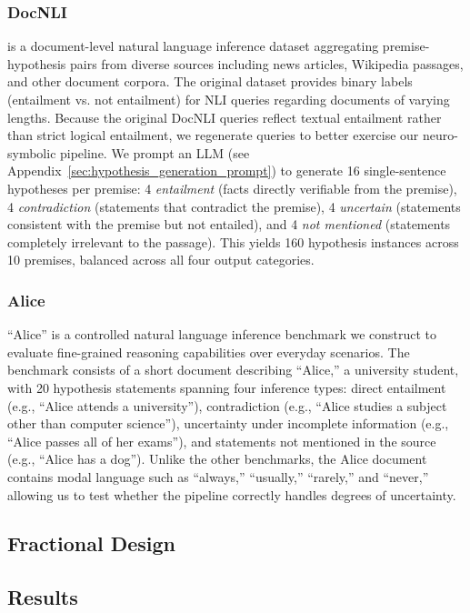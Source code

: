 \documentclass{article} %
\begin{document}
\subsubsection{DocNLI} 
\citep{yin2021docnli} is a document-level natural language inference dataset aggregating premise-hypothesis pairs from diverse sources including news articles, Wikipedia passages, and other document corpora. The original dataset provides binary labels (entailment vs. not entailment) for NLI queries regarding documents of varying lengths. 
Because the original DocNLI queries reflect textual entailment rather than strict logical entailment, we regenerate queries to better exercise our neuro-symbolic pipeline. We prompt an LLM (see Appendix~\ref{sec:hypothesis_generation_prompt}) to generate 16 single-sentence hypotheses per premise: 4 \emph{entailment} (facts directly verifiable from the premise), 4 \emph{contradiction} (statements that contradict the premise), 4 \emph{uncertain} (statements consistent with the premise but not entailed), and 4 \emph{not mentioned} (statements completely irrelevant to the passage). This yields 160 hypothesis instances across 10 premises, balanced across all four output categories.





\subsubsection{Alice}
``Alice'' is a controlled natural language inference benchmark we construct to evaluate fine-grained reasoning capabilities over everyday scenarios. The benchmark consists of a short document describing ``Alice,'' a university student, with 20 hypothesis statements spanning four inference types: direct entailment (e.g., ``Alice attends a university''), contradiction (e.g., ``Alice studies a subject other than computer science''), uncertainty under incomplete information (e.g., ``Alice passes all of her exams''), and statements not mentioned in the source (e.g., ``Alice has a dog''). Unlike the other benchmarks, the Alice document contains modal language such as ``always,'' ``usually,'' ``rarely,'' and ``never,'' allowing us to test whether the pipeline correctly handles degrees of uncertainty. 


\subsection{Fractional Design}

\subsection{Results}
\end{document}
